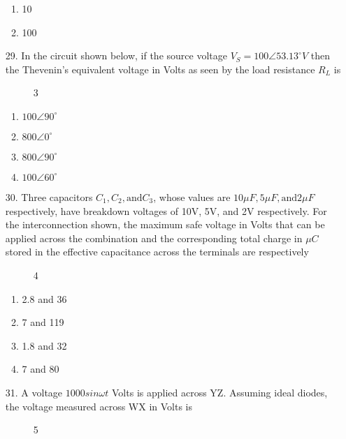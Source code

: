 \documentclass[journal]{IEEEtran}
\begin{document}
\begin{enumerate}
\begin{enumerate}[label=(\Alph*)]
        \item 10
        \item 100
    \end{enumerate}
    \item[29.] In the circuit shown below, if the source voltage $V_S = 100\angle53.13^{\circ} V$ then the Thevenin's equivalent
    voltage in Volts as seen by the load resistance $R_L$ is 
    \begin{figure}[!ht]
        \centering
        \caption{3}
    \end{figure}
    \begin{enumerate}[label=(\Alph*)]
        \item $100\angle90^{\circ}$
        \item $800\angle0^{\circ}$
        \item $800\angle90^{\circ}$
        \item $100\angle60^{\circ}$
    \end{enumerate}
    \item[30.] Three capacitors $C_1, C_2, \text{and} C_3$, whose values are $10\mu F, 5\mu F, \text{and} 2\mu F$ respectively, have
    breakdown voltages of 10V, 5V, and 2V respectively. For the interconnection shown, the maximum
    safe voltage in Volts that can be applied across the combination and the corresponding total charge
    in $\mu C$ stored in the effective capacitance across the terminals are respectively
    \begin{figure}[!ht]
        \centering
        \caption{4}
    \end{figure}
    \begin{enumerate}[label=(\Alph*)]
        \item 2.8 and 36
        \item 7 and 119
        \item 1.8 and 32
        \item 7 and 80
    \end{enumerate}
    \item[31.] A voltage $1000sin\omega t$ Volts is applied across YZ. Assuming ideal diodes, the voltage measured
    across WX in Volts is 
    \begin{figure}[!ht]
        \centering
        \caption{5}
    \end{figure}

\end{enumerate}
\end{document}

